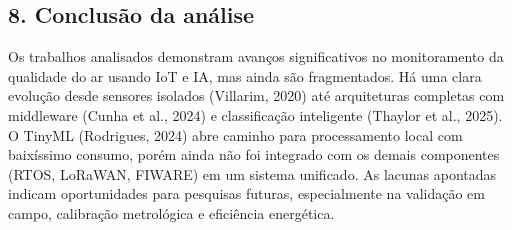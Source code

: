 \documentclass[12pt,a4paper]{article}
\begin{document}
\subsection*{8. Conclusão da análise}

Os trabalhos analisados demonstram avanços significativos no monitoramento da qualidade do ar usando IoT e IA, mas ainda são fragmentados. Há uma clara evolução desde sensores isolados (Villarim, 2020) até arquiteturas completas com middleware (Cunha et al., 2024) e classificação inteligente (Thaylor et al., 2025). O TinyML (Rodrigues, 2024) abre caminho para processamento local com baixíssimo consumo, porém ainda não foi integrado com os demais componentes (RTOS, LoRaWAN, FIWARE) em um sistema unificado. As lacunas apontadas indicam oportunidades para pesquisas futuras, especialmente na validação em campo, calibração metrológica e eficiência energética.

\newpage

\nocite{silva2025airpure,
  rodrigues2024tinyml,
  ladeira2024mliot,
  Aserkar2024,
  villarim2020sensor,
  rodrigues2020aplicativo,
  franciscomonitoramento,
  cunha2024,
  alves2025freertos,
  wcama}
\printbibliography
\end{document}
